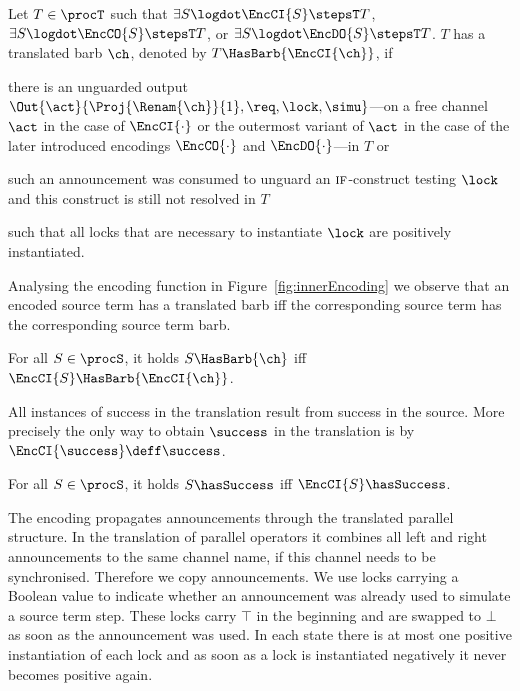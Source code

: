 \documentclass[copyright,creativecommons]{eptcs}
\begin{document}
\begin{definition}
	Let $ T \in \procT $ such that $ \exists S\logdot \EncCI{S} \stepsT T $, $ \exists S\logdot \EncCO{S} \stepsT T $, or $ \exists S\logdot \EncDO{S} \stepsT T $.
	$ T $ has a translated barb $ \ch $, denoted by $ T\HasBarb{\EncCI{\ch}} $, if
	\begin{compactitem}
		\item there is an unguarded output $ \Out{\act}{\Proj{\Renam{\ch}}{1}, \req, \lock, \simu} $---on a free channel $ \act $ in the case of $ \EncCI{\cdot} $ or the outermost variant of $ \act $ in the case of the later introduced encodings $ \EncCO{\cdot} $ and $ \EncDO{\cdot} $---in $ T $ or
		\item such an announcement was consumed to unguard an $ \textsc{if} $-construct testing $ \lock $ and this construct is still not resolved in $ T $
	\end{compactitem}
	such that all locks that are necessary to instantiate $ \lock $ are positively instantiated.
\end{definition}

Analysing the encoding function in Figure~\ref{fig:innerEncoding} we observe that an encoded source term has a translated barb iff the corresponding source term has the corresponding source term barb.

\begin{obs}
	For all $ S \in \procS $, it holds $ S\HasBarb{\ch} $ iff $ \EncCI{S}\HasBarb{\EncCI{\ch}} $.
	\label{obs:transBarbs}
\end{obs}

All instances of success in the translation result from success in the source. More precisely the only way to obtain $ \success $ in the translation is by $ \EncCI{\success} \deff \success $.

\begin{obs}
	For all $ S \in \procS $, it holds $ S\hasSuccess $ iff $ \EncCI{S}\hasSuccess $.
	\label{obs:success}
\end{obs}

The encoding propagates announcements through the translated parallel structure. In the translation of parallel operators it combines all left and right announcements \wrt to the same channel name, if this channel needs to be synchronised. Therefore we copy announcements.
We use locks carrying a Boolean value to indicate whether an announcement was already used to simulate a source term step. These locks carry $ \top $ in the beginning and are swapped to $ \bot $ as soon as the announcement was used. In each state there is at most one positive instantiation of each lock and as soon as a lock is instantiated negatively it never becomes positive again.
\end{document}
